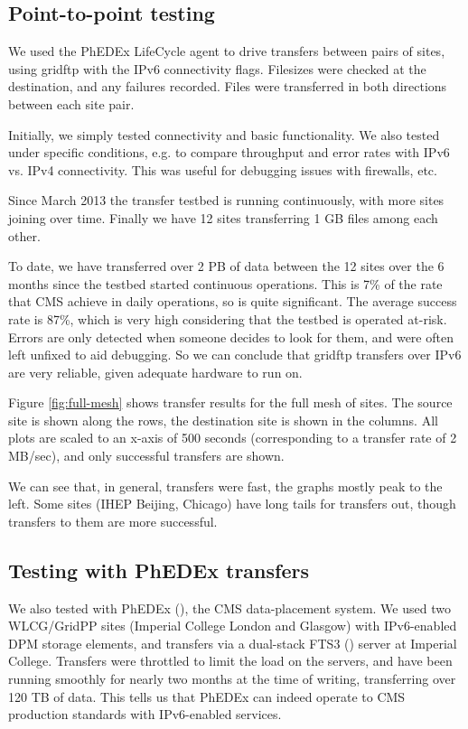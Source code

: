 \subsection{Point-to-point testing}

We used the PhEDEx LifeCycle agent \cite{LifeCycle} to drive transfers between pairs of sites, using gridftp with the IPv6 connectivity flags. Filesizes were checked at the destination, and any failures recorded. Files were transferred in both directions between each site pair.

Initially, we simply tested connectivity and basic functionality. We also tested under specific conditions, e.g. to compare throughput and error rates with IPv6 vs. IPv4 connectivity. This was useful for debugging issues with firewalls, etc.

Since March 2013 the transfer testbed is running continuously, with more sites joining over time. Finally we have 12 sites transferring 1 GB files among each other.

To date, we have transferred over 2 PB of data between the 12 sites over the 6 months since the testbed started continuous operations. This is 7\% of the rate that CMS achieve in daily operations, so is quite significant. The average success rate is 87\%, which is very high considering that the testbed is operated at-risk. Errors are only detected when someone decides to look for them, and were often left unfixed to aid debugging.
So we can conclude that gridftp transfers over IPv6 are very reliable, given adequate hardware to run on.

Figure \ref{fig:full-mesh} shows transfer results for the full mesh of sites. The source site is shown along the rows, the destination site is shown in the columns. All plots are scaled to an x-axis of 500 seconds (corresponding to a transfer rate of 2 MB/sec), and only successful transfers are shown.

We can see that, in general, transfers were fast, the graphs mostly peak to the left. Some sites (IHEP Beijing, Chicago) have long tails for transfers out, though transfers to them are more successful.

\subsection{Testing with PhEDEx transfers}
We also tested with PhEDEx (\cite{PhEDEx}), the CMS data-placement system. We used two WLCG/GridPP sites (Imperial College London and Glasgow) with IPv6-enabled DPM storage elements, and transfers via a dual-stack FTS3 (\cite{FTS3}) server at Imperial College. Transfers were throttled to limit the load on the servers, and have been running smoothly for nearly two months at the time of writing, transferring over 120 TB of data. This tells us that PhEDEx can indeed operate to CMS production standards with IPv6-enabled services.

